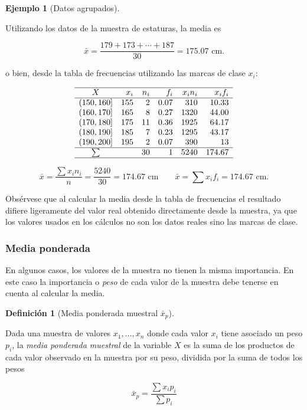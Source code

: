 \documentclass[
  spanish,
  a4paper,
]{scrreport}
\theoremstyle{plain}
\theoremstyle{definition}
\newtheorem{example}{Ejemplo}[chapter]
\theoremstyle{definition}
\newtheorem{definition}{Definición}[chapter]
\theoremstyle{remark}
\begin{document}
\begin{example}[Datos
agrupados]\protect\hypertarget{exm-media-datos-agrupados}{}\label{exm-media-datos-agrupados}

Utilizando los datos de la muestra de estaturas, la media es

\[
\bar{x} = \frac{179+173+\cdots+187}{30} = 175.07 \mbox{ cm}.
\]

o bien, desde la tabla de frecuencias utilizando las marcas de clase
\(x_i\):

\[
\begin{array}{crrrrr}
\hline
X & x_i & n_i & f_i & x_in_i & x_if_i\\
\hline
(150,160] & 155 & 2 & 0.07 & 310 & 10.33\\
(160,170] & 165 & 8 & 0.27 & 1320 & 44.00\\
(170,180] & 175 & 11 & 0.36 & 1925 & 64.17\\
(180,190] & 185 & 7 & 0.23 & 1295 & 43.17\\
(190,200] & 195 & 2 & 0.07 & 390 & 13 \\
\hline
\sum &  & 30 & 1 & 5240 & 174.67 \\
\hline
\end{array}
\]

\[
\bar{x} = \frac{\sum x_in_i}{n} = \frac{5240}{30}= 174.67 \mbox{ cm} \qquad \bar{x}=\sum{x_if_i} = 174.67 \mbox{ cm}.
\]

Obsérvese que al calcular la media desde la tabla de frecuencias el
resultado difiere ligeramente del valor real obtenido directamente desde
la muestra, ya que los valores usados en los cálculos no son los datos
reales sino las marcas de clase.

\end{example}

\subsubsection{Media ponderada}\label{media-ponderada}

En algunos casos, los valores de la muestra no tienen la misma
importancia. En este caso la importancia o \emph{peso} de cada valor de
la muestra debe tenerse en cuenta al calcular la media.

\begin{definition}[Media ponderada muestral
\(\bar x_p\)]\protect\hypertarget{def-media-ponderada}{}\label{def-media-ponderada}

Dada una muestra de valores \(x_1,\ldots, x_n\) donde cada valor \(x_i\)
tiene asociado un peso \(p_i\), la \emph{media ponderada muestral} de la
variable \(X\) es la suma de los productos de cada valor observado en la
muestra por su peso, dividida por la suma de todos los pesos

\[\bar{x}_p = \frac{\sum x_ip_i}{\sum p_i}\]

\end{definition}
\end{document}
